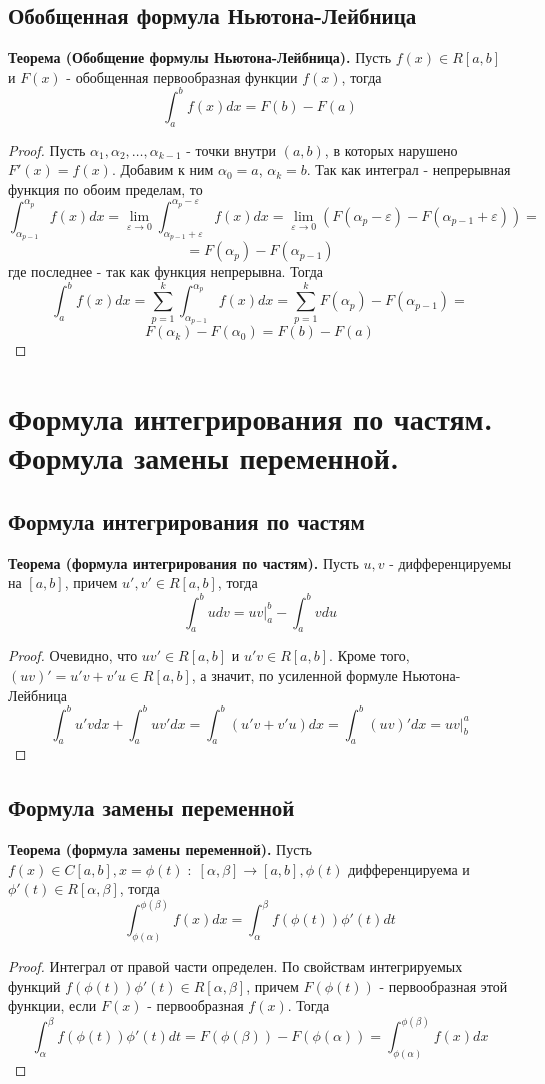 \documentclass{article}
\newcommand*{\limToZero}[2]{\displaystyle \lim_{#1 \to 0} #2}
\newcommand*{\theorem}[2]{\textbf{Теорема #1. } #2 \newline}
\newcommand*{\eps}{\varepsilon}
\begin{document}
\subsection{Обобщенная формула Ньютона-Лейбница}
\theorem{(Обобщение формулы Ньютона-Лейбница)}{Пусть $f(x) \in R[a, b]$ и $F(x)$ - обобщенная первообразная функции $f(x)$, тогда}
$$
    \int_{a}^{b}f(x)dx = F(b) - F(a)
$$ 
\begin{proof}
    Пусть $\alpha_1, \alpha_2, \dots, \alpha_{k-1}$ - точки внутри $(a, b)$, в которых нарушено $F'(x) = f(x)$. Добавим к ним $\alpha_0 = a$, $\alpha_k = b$. Так как интеграл - непрерывная функция по обоим пределам, то
    $$
        \int_{\alpha_{p - 1}}^{\alpha_p} f(x)dx = \limToZero{\eps}{\int_{\alpha_{p-1} + \eps}^{\alpha_p - \eps} f(x)dx} = \limToZero{\eps}{(F(\alpha_p - \eps) - F(\alpha_{p - 1} + \eps))} = 
    $$
    $$
        = F(\alpha_p) - F(\alpha_{p - 1})
    $$
    где последнее - так как функция непрерывна. Тогда 
    $$
        \int_{a}^{b} f(x)dx = \sum_{p = 1}^{k} \int_{\alpha_{p-1}}^{\alpha_p}f(x)dx = \sum_{p = 1}^{k} F(\alpha_p) - F(\alpha_{p - 1}) = 
    $$
    $$
        F(\alpha_k) - F(\alpha_0) = F(b) - F(a)
    $$
\end{proof}
\section{Формула интегрирования по частям. Формула замены переменной.}
\subsection{Формула интегрирования по частям}
\theorem{(формула интегрирования по частям)}{Пусть $u, v$ - дифференцируемы на $[a, b]$, причем $u', v' \in R[a, b]$, тогда}
$$
    \int_{a}^{b} udv = uv\Bigr|^{b}_{a} - \int_{a}^{b} vdu
$$
\begin{proof}
    Очевидно, что $uv' \in R[a, b]$ и $u'v \in R[a, b]$. Кроме того, $(uv)' = u'v + v'u \in R[a, b]$, а значит, по усиленной формуле Ньютона-Лейбница
    $$
        \int_{a}^{b}u'vdx + \int_{a}^{b}uv'dx = \int_{a}^{b}(u'v + v'u)dx = \int_{a}^{b}(uv)'dx = uv\Bigr|^{a}_{b}
    $$
\end{proof}
\subsection{Формула замены переменной}
\theorem{(формула замены переменной)}{Пусть $f(x) \in C[a, b], x = \phi(t)\;:\; [\alpha, \beta] \to [a, b], \phi(t)$ дифференцируема и $\phi'(t) \in R[\alpha, \beta]$, тогда}
$$
    \int_{\phi(\alpha)}^{\phi(\beta)} f(x)dx = \int_{\alpha}^{\beta} f(\phi(t))\phi'(t)dt
$$
\begin{proof}
    Интеграл от правой части определен. По свойствам интегрируемых функций $f(\phi(t))\phi'(t) \in R[\alpha, \beta]$, причем $F(\phi(t))$ - первообразная этой функции, если $F(x)$ - первообразная $f(x)$. Тогда
    $$
        \int_{\alpha}^{\beta} f(\phi(t))\phi'(t)dt = F(\phi(\beta)) - F(\phi(\alpha)) = \int_{\phi(\alpha)}^{\phi(\beta)} f(x)dx
    $$
\end{proof}
\end{document}
